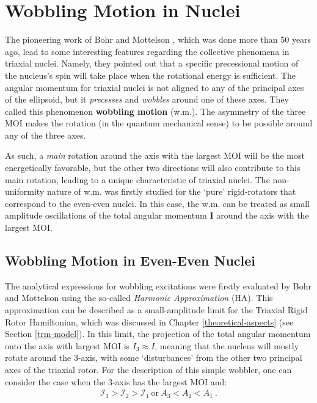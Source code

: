 \chapter{Wobbling Motion in Nuclei}
\label{chapter-5}

The pioneering work of Bohr and Mottelson \cite{bohr1998nuclear}, which was done more than 50 years ago, lead to some interesting features regarding the collective phenomena in triaxial nuclei. Namely, they pointed out that a specific precessional motion of the nucleus's spin will take place when the rotational energy is sufficient. The angular momentum for triaxial nuclei is not aligned to any of the principal axes of the ellipsoid, but it \emph{precesses} and \emph{wobbles} around one of these axes. They called this phenomenon \textbf{wobbling motion} (w.m.). The asymmetry of the three MOI makes the rotation (in the quantum mechanical sense) to be possible around any of the three axes.

As such, a \emph{main} rotation around the axis with the largest MOI will be the most energetically favorable, but the other two directions will also contribute to this main rotation, leading to a unique characteristic of triaxial nuclei. The non-uniformity nature of w.m. was firstly studied for the `pure' rigid-rotators that correspond to the even-even nuclei. In this case, the w.m. can be treated as small amplitude oscillations of the total angular momentum $\mathbf{I}$ around the axis with the largest MOI.

\section{Wobbling Motion in Even-Even Nuclei}

The analytical expressions for wobbling excitations were firstly evaluated by Bohr and Mottelson using the so-called \emph{Harmonic Approximation} (HA). This approximation can be described as a small-amplitude limit for the Triaxial Rigid Rotor Hamiltonian, which was discussed in Chapter \ref{theoretical-aspects} (see Section \ref{trm-model}). In this limit, the projection of the total angular momentum onto the axis with largest MOI is $I_3\approx I$, meaning that the nucleus will mostly rotate around the $3$-axis, with some `disturbances' from the other two principal axes of the triaxial rotor. For the description of this simple wobbler, one can consider the case when the $3$-axis has the largest MOI and:
\begin{align}
    \mathcal{I}_3>\mathcal{I}_2>\mathcal{I}_1\ \text{or}\ A_3<A_2<A_1\ .
\end{align}

